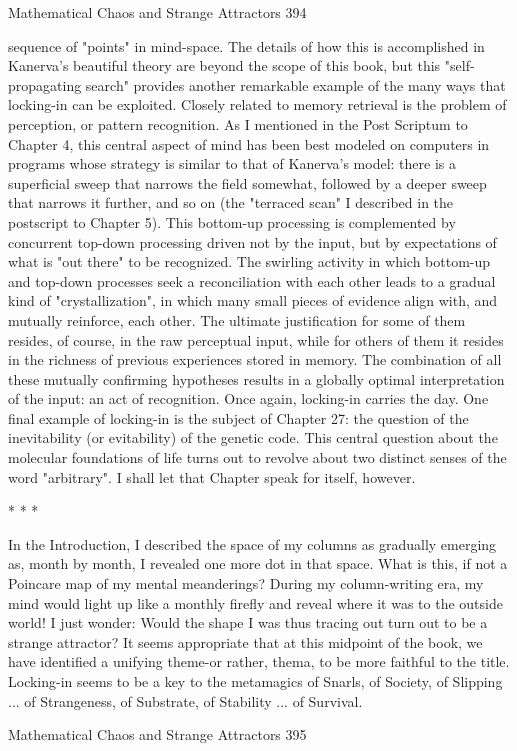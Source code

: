 Mathematical Chaos and Strange Attractors                                             394

sequence of "points" in mind-space. The details of how this is accomplished in
Kanerva's beautiful theory are beyond the scope of this book, but this "self-
propagating search" provides another remarkable example of the many ways that
locking-in can be exploited.
        Closely related to memory retrieval is the problem of perception, or pattern
recognition. As I mentioned in the Post Scriptum to Chapter 4, this central aspect of
mind has been best modeled on computers in programs whose strategy is similar to
that of Kanerva's model: there is a superficial sweep that narrows the field somewhat,
followed by a deeper sweep that narrows it further, and so on (the "terraced scan" I
described in the postscript to Chapter 5). This bottom-up processing is complemented
by concurrent top-down processing driven not by the input, but by expectations of
what is "out there" to be recognized. The swirling activity in which bottom-up and
top-down processes seek a reconciliation with each other leads to a gradual kind of
"crystallization", in which many small pieces of evidence align with, and mutually
reinforce, each other. The ultimate justification for some of them resides, of course, in
the raw perceptual input, while for others of them it resides in the richness of previous
experiences stored in memory. The combination of all these mutually confirming
hypotheses results in a globally optimal interpretation of the input: an act of
recognition. Once again, locking-in carries the day.
        One final example of locking-in is the subject of Chapter 27: the question of
the inevitability (or evitability) of the genetic code. This central question about the
molecular foundations of life turns out to revolve about two distinct senses of the
word "arbitrary". I shall let that Chapter speak for itself, however.

                                       *   *   *

        In the Introduction, I described the space of my columns as gradually
emerging as, month by month, I revealed one more dot in that space. What is this, if
not a Poincare map of my mental meanderings? During my column-writing era, my
mind would light up like a monthly firefly and reveal where it was to the outside
world! I just wonder: Would the shape I was thus tracing out turn out to be a strange
attractor?
        It seems appropriate that at this midpoint of the book, we have identified a
unifying theme-or rather, thema, to be more faithful to the title. Locking-in seems to
be a key to the metamagics of Snarls, of Society, of Slipping ... of Strangeness, of
Substrate, of Stability ... of Survival.




Mathematical Chaos and Strange Attractors                                            395

